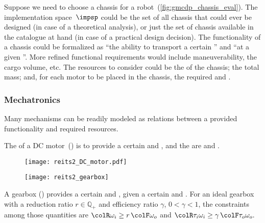 \begin{example}
\label{exa:chassis}Suppose we need to choose a chassis for a robot~(\cref{fig:gmcdp_chassis_eval}).
The implementation space~$\impsp$ could be the set of all chassis
that could ever be designed (in case of a theoretical analysis), or
just the set of chassis available in the catalogue at hand (in case
of a practical design decision). The functionality of a chassis could
be formalized as ``the ability to transport a certain '' and ``at a given ''. More refined
functional requirements would include maneuverability, the cargo volume,
etc. The resources to consider could be the  of
the chassis; the total mass; and, for each motor to be placed in the
chassis, the required  and .
\end{example}
 

\subsubsection{Mechatronics}


Many mechanisms can be readily modeled as relations between a provided
functionality and required resources.


\begin{example}
The  of a DC motor~()
is to provide a certain  and , and the 
are  and .
\end{example}

\begin{figure}[h]
    \centering
     
    \texttt{[image: reits2\_DC\_motor.pdf]}
\caption{\label{fig:dc_motor}}
\end{figure}


\begin{figure}[h]
    \centering
    \texttt{[image: reits2\_gearbox]}
    \caption{ \label{fig:gearbox}}
\end{figure}

\begin{example}
A gearbox () provides a certain  and , given a certain
 and . For
an ideal gearbox with a reduction ratio $r \in \mathbb{ℚ}_+$ and
efficiency ratio $\gamma$, $0<\gamma<1$, the constraints among
those quantities are ${\colR \omega_i}\geq r\,{\colF \omega_o}$
and ${\colR \tau_i\omega_i}\geq\gamma\,{\colF \tau_o\omega_o}.$
\end{example}


